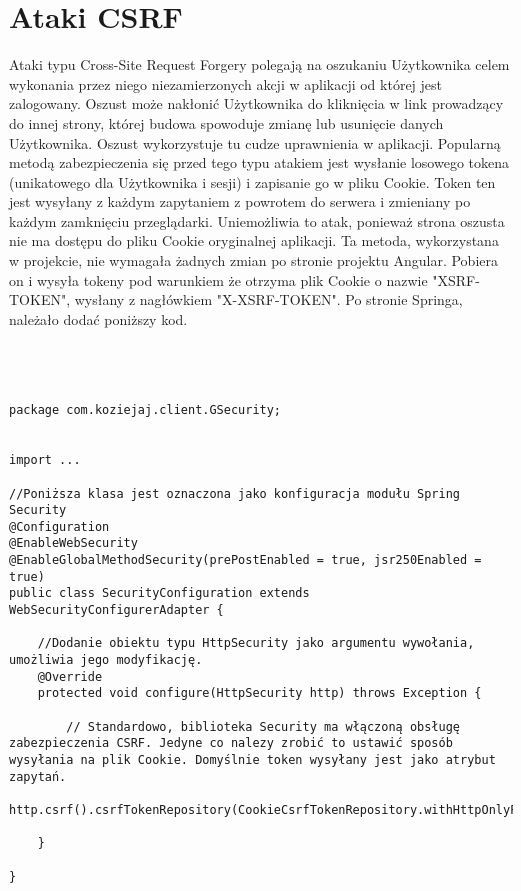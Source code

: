 \documentclass[a4paper,12pt,twoside,openany]{report}
\begin{document}
\section{Ataki CSRF}
Ataki typu Cross-Site Request Forgery \cite{Owasp} polegają na oszukaniu Użytkownika celem wykonania przez niego niezamierzonych akcji w aplikacji od której jest zalogowany. Oszust może nakłonić Użytkownika do kliknięcia w link prowadzący do innej strony, której budowa spowoduje zmianę lub usunięcie  danych Użytkownika. Oszust wykorzystuje tu cudze uprawnienia w aplikacji. Popularną metodą zabezpieczenia się przed tego typu atakiem jest wysłanie losowego tokena (unikatowego dla Użytkownika i sesji) i zapisanie go w pliku Cookie. Token ten jest wysyłany z każdym zapytaniem z powrotem do serwera i zmieniany po każdym zamknięciu przeglądarki. Uniemożliwia to atak, ponieważ strona oszusta nie ma dostępu do pliku Cookie oryginalnej aplikacji. Ta metoda, wykorzystana w projekcie, nie wymagała żadnych zmian po stronie projektu Angular. Pobiera on i wysyła tokeny pod warunkiem że otrzyma plik Cookie o nazwie "XSRF-TOKEN", wysłany z nagłówkiem "X-XSRF-TOKEN". Po stronie Springa, należało dodać poniższy kod.\\\\\\\\
\begin{lstlisting}
package com.koziejaj.client.GSecurity;


import ...

//Poniższa klasa jest oznaczona jako konfiguracja modułu Spring Security
@Configuration
@EnableWebSecurity
@EnableGlobalMethodSecurity(prePostEnabled = true, jsr250Enabled = true)
public class SecurityConfiguration extends WebSecurityConfigurerAdapter {

	//Dodanie obiektu typu HttpSecurity jako argumentu wywołania, umożliwia jego modyfikację.
    @Override
    protected void configure(HttpSecurity http) throws Exception {
    
		// Standardowo, biblioteka Security ma włączoną obsługę zabezpieczenia CSRF. Jedyne co nalezy zrobić to ustawić sposób wysyłania na plik Cookie. Domyślnie token wysyłany jest jako atrybut zapytań.
        http.csrf().csrfTokenRepository(CookieCsrfTokenRepository.withHttpOnlyFalse());

    }

}
\end{lstlisting}
\end{document}
